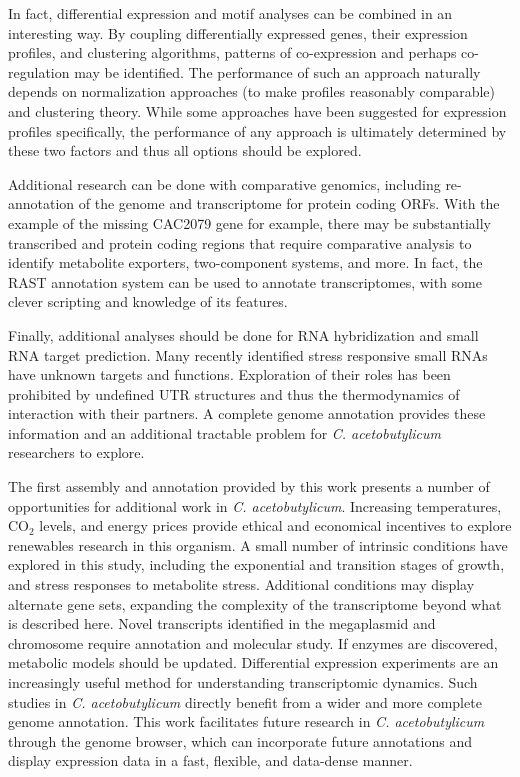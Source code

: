 In fact, differential expression and motif analyses can be combined in an interesting way. By coupling differentially expressed genes, their expression profiles, and clustering algorithms, patterns of co-expression and perhaps co-regulation may be identified. The performance of such an approach naturally depends on normalization approaches (to make profiles reasonably comparable) and clustering theory. While some approaches have been suggested for expression profiles specifically, the performance of any approach is ultimately determined by these two factors and thus all options should be explored. 

Additional research can be done with comparative genomics, including re-annotation of the genome and transcriptome for protein coding ORFs. With the example of the missing CAC2079 gene for example, there may be substantially transcribed and protein coding regions that require comparative analysis to identify metabolite exporters, two-component systems, and more. In fact, the RAST annotation system\cite{160} can be used to annotate transcriptomes, with some clever scripting and knowledge of its features.

Finally, additional analyses should be done for RNA hybridization and small RNA target prediction. Many recently identified stress responsive small RNAs\cite{39} have unknown targets and functions. Exploration of their roles has been prohibited by undefined UTR structures and thus the thermodynamics of interaction with their partners. A complete genome annotation provides these information and an additional tractable problem for \textit{C. acetobutylicum} researchers to explore.

The first assembly and annotation provided by this work presents a number of opportunities for additional work in \textit{C. acetobutylicum}. Increasing temperatures, CO$_{2}$ levels, and energy prices provide ethical and economical incentives to explore renewables research in this organism. A small number of intrinsic conditions have explored in this study, including the exponential and transition stages of growth, and stress responses to metabolite stress. Additional conditions may display alternate gene sets, expanding the complexity of the transcriptome beyond what is described here. Novel transcripts identified in the megaplasmid and chromosome require annotation and molecular study. If enzymes are discovered, metabolic models should be updated. Differential expression experiments are an increasingly useful method for understanding transcriptomic dynamics. Such studies in \textit{C. acetobutylicum} directly benefit from a wider and more complete genome annotation. This work facilitates future research in \textit{C. acetobutylicum} through the genome browser, which can incorporate future annotations and display expression data in a fast, flexible, and data-dense manner.



